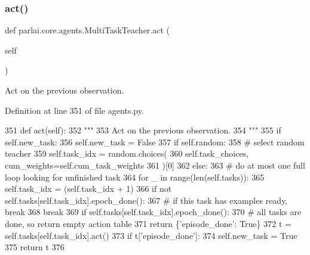 \subsubsection{\texorpdfstring{act()}{act()}}
{\footnotesize\ttfamily def parlai.\+core.\+agents.\+Multi\+Task\+Teacher.\+act (\begin{DoxyParamCaption}\item[{}]{self }\end{DoxyParamCaption})}

\begin{DoxyVerb}Act on the previous observation.
\end{DoxyVerb}
 

Definition at line 351 of file agents.\+py.


\begin{DoxyCode}
351     \textcolor{keyword}{def }act(self):
352         \textcolor{stringliteral}{"""}
353 \textcolor{stringliteral}{        Act on the previous observation.}
354 \textcolor{stringliteral}{        """}
355         \textcolor{keywordflow}{if} self.new\_task:
356             self.new\_task = \textcolor{keyword}{False}
357             \textcolor{keywordflow}{if} self.random:
358                 \textcolor{comment}{# select random teacher}
359                 self.task\_idx = random.choices(
360                     self.task\_choices, cum\_weights=self.cum\_task\_weights
361                 )[0]
362             \textcolor{keywordflow}{else}:
363                 \textcolor{comment}{# do at most one full loop looking for unfinished task}
364                 \textcolor{keywordflow}{for} \_ \textcolor{keywordflow}{in} range(len(self.tasks)):
365                     self.task\_idx = (self.task\_idx + 1) %
366                     \textcolor{keywordflow}{if} \textcolor{keywordflow}{not} self.tasks[self.task\_idx].epoch\_done():
367                         \textcolor{comment}{# if this task has examples ready, break}
368                         \textcolor{keywordflow}{break}
369                 \textcolor{keywordflow}{if} self.tasks[self.task\_idx].epoch\_done():
370                     \textcolor{comment}{# all tasks are done, so return empty action table}
371                     \textcolor{keywordflow}{return} \{\textcolor{stringliteral}{'episode\_done'}: \textcolor{keyword}{True}\}
372         t = self.tasks[self.task\_idx].act()
373         \textcolor{keywordflow}{if} t[\textcolor{stringliteral}{'episode\_done'}]:
374             self.new\_task = \textcolor{keyword}{True}
375         \textcolor{keywordflow}{return} t
376 
\end{DoxyCode}
\mbox{\label{classparlai_1_1core_1_1agents_1_1MultiTaskTeacher_a17444e342ab19c23cee28bba08a64df9}} 
